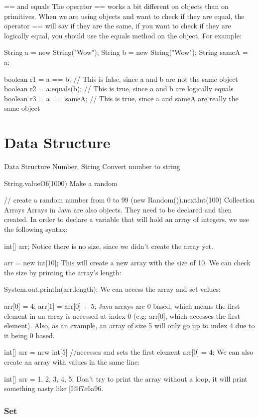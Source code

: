 == and equals
The operator == works a bit different on objects than on primitives. When we are using objects and want to check if they are equal, the operator == will say if they are the same, if you want to check if they are logically equal, you should use the equals method on the object. For example:

String a = new String("Wow");
String b = new String("Wow");
String sameA = a;

boolean r1 = a == b;      // This is false, since a and b are not the same object
boolean r2 = a.equals(b); // This is true, since a and b are logically equals
boolean r3 = a == sameA;  // This is true, since a and sameA are really the same object

\chapter{Data Structure}

Data Structure
Number, String
Convert number to string

String.valueOf(1000)
Make a random

// create a random number from 0 to 99
(new Random()).nextInt(100)
Collection
Arrays
Arrays in Java are also objects. They need to be declared and then created. In order to declare a variable that will hold an array of integers, we use the following syntax:

int[] arr;
Notice there is no size, since we didn't create the array yet.

arr = new int[10];
This will create a new array with the size of 10. We can check the size by printing the array's length:

System.out.println(arr.length);
We can access the array and set values:

arr[0] = 4;
arr[1] = arr[0] + 5;
Java arrays are 0 based, which means the first element in an array is accessed at index 0 (e.g: arr[0], which accesses the first element). Also, as an example, an array of size 5 will only go up to index 4 due to it being 0 based.

int[] arr = new int[5]
//accesses and sets the first element
arr[0] = 4;
We can also create an array with values in the same line:

int[] arr = {1, 2, 3, 4, 5};
Don't try to print the array without a loop, it will print something nasty like [I@f7e6a96.

\subsection{Set}

